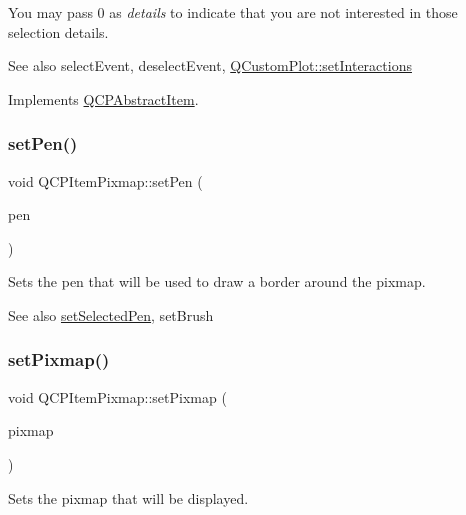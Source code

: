 You may pass 0 as {\itshape details} to indicate that you are not interested in those selection details.

\begin{DoxySeeAlso}{See also}
select\+Event, deselect\+Event, \hyperlink{class_q_custom_plot_a5ee1e2f6ae27419deca53e75907c27e5}{Q\+Custom\+Plot\+::set\+Interactions} 
\end{DoxySeeAlso}


Implements \hyperlink{class_q_c_p_abstract_item_a96d522d10ffc0413b9a366c6f7f0476b}{Q\+C\+P\+Abstract\+Item}.

\hypertarget{class_q_c_p_item_pixmap_acdade1305edb4b5cae14f97fd132065f}{}\label{class_q_c_p_item_pixmap_acdade1305edb4b5cae14f97fd132065f} 
\subsubsection{\texorpdfstring{set\+Pen()}{setPen()}}
{\footnotesize\ttfamily void Q\+C\+P\+Item\+Pixmap\+::set\+Pen (\begin{DoxyParamCaption}\item[{const Q\+Pen \&}]{pen }\end{DoxyParamCaption})}

Sets the pen that will be used to draw a border around the pixmap.

\begin{DoxySeeAlso}{See also}
\hyperlink{class_q_c_p_item_pixmap_afc5e479e88e53740176ce77cb70dd67a}{set\+Selected\+Pen}, set\+Brush 
\end{DoxySeeAlso}
\hypertarget{class_q_c_p_item_pixmap_a726b69ea4025edf48f9b29b6450548a7}{}\label{class_q_c_p_item_pixmap_a726b69ea4025edf48f9b29b6450548a7} 
\subsubsection{\texorpdfstring{set\+Pixmap()}{setPixmap()}}
{\footnotesize\ttfamily void Q\+C\+P\+Item\+Pixmap\+::set\+Pixmap (\begin{DoxyParamCaption}\item[{const Q\+Pixmap \&}]{pixmap }\end{DoxyParamCaption})}

Sets the pixmap that will be displayed. \hypertarget{class_q_c_p_item_pixmap_ab4d44529a1c6c8d37d0ea7560e042777}{}\label{class_q_c_p_item_pixmap_ab4d44529a1c6c8d37d0ea7560e042777} 
